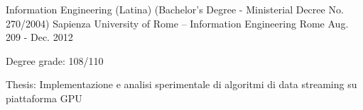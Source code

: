 

\begin{cventries}

  \cventry
    {Information Engineering (Latina) (Bachelor's Degree - Ministerial Decree No. 270/2004)} %
    {Sapienza University of Rome – Information Engineering} %
    {Rome} %
    {Aug. 209 - Dec. 2012} %
    {
      \begin{cvitems} %
        \item {Degree grade: 108/110}
        \item {Thesis: Implementazione e analisi sperimentale di algoritmi di data streaming su piattaforma GPU}
      \end{cvitems}
    }

\end{cventries}
